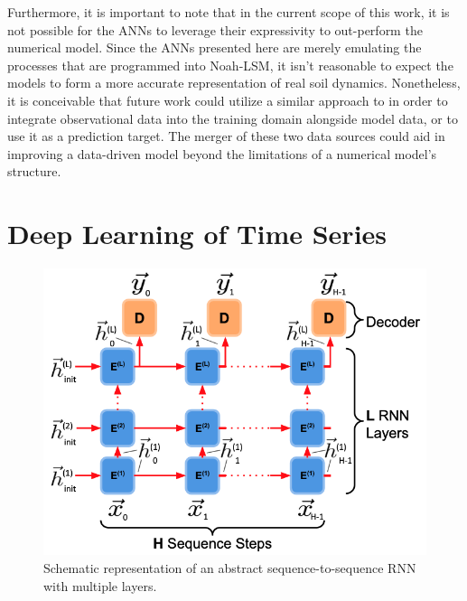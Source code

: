 Furthermore, it is important to note that in the current scope of this work, it is not possible for the ANNs to leverage their expressivity to out-perform the numerical model. Since the ANNs presented here are merely emulating the processes that are programmed into Noah-LSM, it isn't reasonable to expect the models to form a more accurate representation of real soil dynamics. Nonetheless, it is conceivable that future work could utilize a similar approach to \parencite{o_global_2021} in order to integrate observational data into the training domain alongside model data, or to use it as a prediction target. The merger of these two data sources could aid in improving a data-driven model beyond the limitations of a numerical model's structure.

\section{Deep Learning of Time Series}

\begin{figure}[h!]
    \centering

    \includegraphics[width=.95\linewidth]{figures/schematic_abstract-rnn.png}

    \caption{Schematic representation of an abstract sequence-to-sequence RNN with multiple layers.}
    \label{schematic-rnn}
\end{figure}

